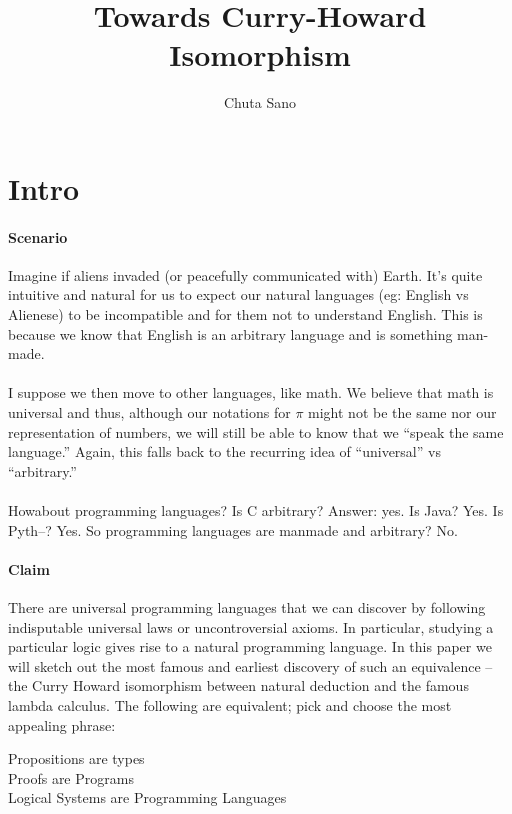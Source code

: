 \documentclass[a4paper]{article}
\title{Towards Curry-Howard Isomorphism}
\author{Chuta Sano}
\begin{document}
\maketitle

\section{Intro}
\paragraph{Scenario}
Imagine if aliens invaded (or peacefully communicated with) Earth. It's quite
intuitive and natural for us to expect our natural languages (eg: English vs
Alienese) to be incompatible and for them not to understand English. This is
because we know that English is an arbitrary language and is something man-made.

\paragraph{}
I suppose we then move to other languages, like math. We believe that math is
universal and thus, although our notations for $\pi$ might not be the same nor
our representation of numbers, we will still be able to know that we ``speak the
same language.'' Again, this falls back to the recurring idea of ``universal''
vs ``arbitrary.''

\paragraph{}
Howabout programming languages? Is C arbitrary? Answer: yes. Is Java? Yes. Is
Pyth--? Yes. So programming languages are manmade and arbitrary? No.

\paragraph{Claim}
There are universal programming languages that we can discover by following
indisputable universal laws or uncontroversial axioms. In particular, studying
a particular logic gives rise to a natural programming language. In this paper
we will sketch out the most famous and earliest discovery of such an equivalence
-- the Curry Howard isomorphism between natural deduction and the famous lambda
calculus. The following are equivalent; pick and choose the most appealing
phrase:

\begin{center}
  Propositions are types \\
  Proofs are Programs \\ 
  Logical Systems are Programming Languages \\
\end{center}
\end{document}
